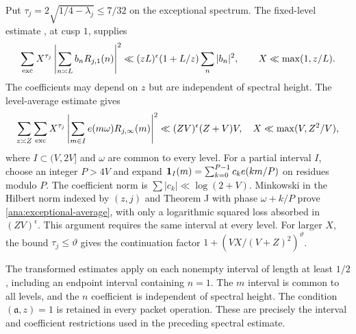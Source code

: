 Put $\tau_j=2\sqrt{1/4-\lambda_j}\le7/32$ on the exceptional
spectrum. The fixed-level estimate \cite[Theorem A]{Pascadi}, at
cusp $1$, supplies
\begin{equation}
 \sum_{\rm exc}X^{\tau_j}
       \left|\sum_{n\asymp L}b_nR_{j,1}(n)\right|^2
 \ll(zL)^\epsilon(1+L/z)\sum_n|b_n|^2,
 \qquad X\ll\max(1,z/L).
 \label{ana:exceptional-fixed}
\end{equation}
The coefficients may depend on $z$ but are independent of spectral
height. The level-average estimate \cite[Theorem J]{Pascadi} gives
\begin{equation}
 \sum_{z\asymp Z}\sum_{\rm exc}X^{\tau_j}
       \left|\sum_{m\in I}e(m\omega)R_{j,\infty}(m)\right|^2
 \ll(ZV)^\epsilon(Z+V)V,
 \quad X\ll\max(V,Z^2/V),
 \label{ana:exceptional-average}
\end{equation}
where $I\subset(V,2V]$ and $\omega$ are common to every level.
For a partial interval $I$, choose an integer $P>4V$ and expand
$\mathbf 1_I(m)=\sum_{k=0}^{P-1}c_ke(km/P)$ on residues modulo $P$.
The coefficient norm is $\sum|c_k|\ll\log(2+V)$.
Minkowski in the Hilbert norm indexed by $(z,j)$ and
Theorem J with phase $\omega+k/P$ prove
\eqref{ana:exceptional-average}, with only a logarithmic squared
loss absorbed in $(ZV)^\epsilon$. This argument requires the same
interval at every level. For larger $X$, the bound
$\tau_j\le\vartheta$ gives the continuation factor
$1+(VX/(V+Z)^2)^\vartheta$.

The transformed estimates apply on each nonempty interval of length
at least $1/2$, including an endpoint interval containing $n=1$.
The $m$ interval is common to all levels, and the $n$ coefficient
is independent of spectral height. The condition
$(\mathfrak a,z)=1$ is retained in every packet operation.
These are precisely the interval and coefficient restrictions used
in the preceding spectral estimate.